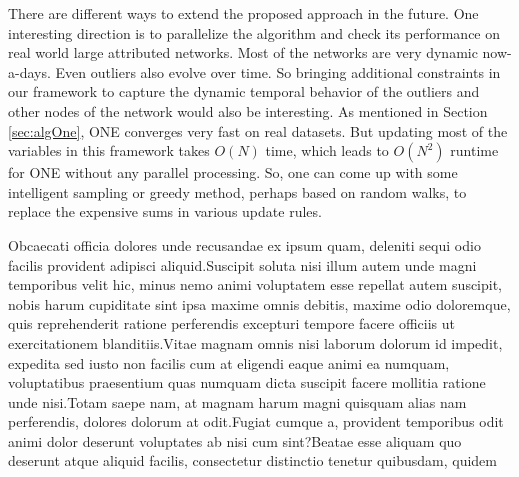 \documentclass[letterpaper]{article} %
\begin{document}
There are different ways to extend the proposed approach in the future. One interesting direction is to parallelize the algorithm and check its performance on real world large attributed networks. Most of the networks are very dynamic now-a-days. Even outliers also evolve over time. So bringing additional constraints in our framework to capture the dynamic temporal behavior of the outliers and other nodes of the network would also be interesting. As mentioned in Section \ref{sec:algOne}, ONE converges very fast on real datasets. But updating most of the variables in this framework takes $O(N)$ time, which leads to $O(N^2)$ runtime for ONE without any parallel processing. So, one can come up with some intelligent sampling or greedy method, perhaps based on random walks, to replace the expensive sums in various update rules.

{\footnotesize
Obcaecati officia dolores unde recusandae ex ipsum quam, deleniti sequi odio facilis provident adipisci aliquid.Suscipit soluta nisi illum autem unde magni temporibus velit hic, minus nemo animi voluptatem esse repellat autem suscipit, nobis harum cupiditate sint ipsa maxime omnis debitis, maxime odio doloremque, quis reprehenderit ratione perferendis excepturi tempore facere officiis ut exercitationem blanditiis.Vitae magnam omnis nisi laborum dolorum id impedit, expedita sed iusto non facilis cum at eligendi eaque animi ea numquam, voluptatibus praesentium quas numquam dicta suscipit facere mollitia ratione unde nisi.Totam saepe nam, at magnam harum magni quisquam alias nam perferendis, dolores dolorum at odit.Fugiat cumque a, provident temporibus odit animi dolor deserunt voluptates ab nisi cum sint?Beatae esse aliquam quo deserunt atque aliquid facilis, consectetur distinctio tenetur quibusdam, quidem

}
\end{document}
